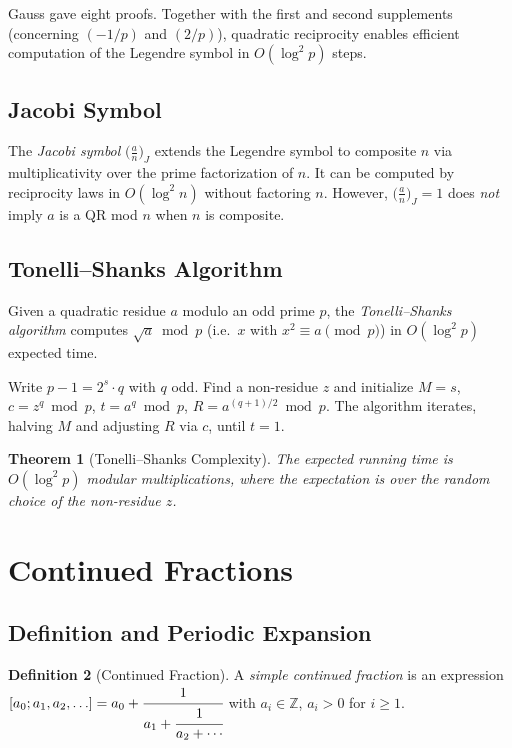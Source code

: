 \documentclass[12pt,a4paper]{amsart}
\newtheorem{theorem}{Theorem}[section]
\theoremstyle{definition}
\newtheorem{definition}[theorem]{Definition}
\begin{document}
Gauss gave eight proofs. Together with the first and second supplements
(concerning $(-1/p)$ and $(2/p)$), quadratic reciprocity enables efficient
computation of the Legendre symbol in $O(\log^2 p)$ steps.

\subsection{Jacobi Symbol}

The \emph{Jacobi symbol} $\bigl(\frac{a}{n}\bigr)_J$ extends the Legendre
symbol to composite $n$ via multiplicativity over the prime factorization of
$n$. It can be computed by reciprocity laws in $O(\log^2 n)$ without
factoring $n$. However, $\bigl(\frac{a}{n}\bigr)_J = 1$ does \emph{not}
imply $a$ is a QR mod $n$ when $n$ is composite.

\subsection{Tonelli--Shanks Algorithm}

Given a quadratic residue $a$ modulo an odd prime $p$, the
\emph{Tonelli--Shanks algorithm} computes $\sqrt{a} \bmod p$ (i.e.\ $x$ with
$x^2 \equiv a \pmod p$) in $O(\log^2 p)$ expected time.

Write $p-1 = 2^s \cdot q$ with $q$ odd. Find a non-residue $z$ and initialize
$M = s$, $c = z^q \bmod p$, $t = a^q \bmod p$, $R = a^{(q+1)/2} \bmod p$.
The algorithm iterates, halving $M$ and adjusting $R$ via $c$, until $t = 1$.

\begin{theorem}[Tonelli--Shanks Complexity]
The expected running time is $O(\log^2 p)$ modular multiplications, where
the expectation is over the random choice of the non-residue $z$.
\end{theorem}

\section{Continued Fractions}

\subsection{Definition and Periodic Expansion}

\begin{definition}[Continued Fraction]
A \emph{simple continued fraction} is an expression
$[a_0; a_1, a_2, \ldots] = a_0 + \cfrac{1}{a_1 + \cfrac{1}{a_2 + \cdots}}$
with $a_i \in \mathbb{Z}$, $a_i > 0$ for $i \ge 1$.
\end{definition}
\end{document}
